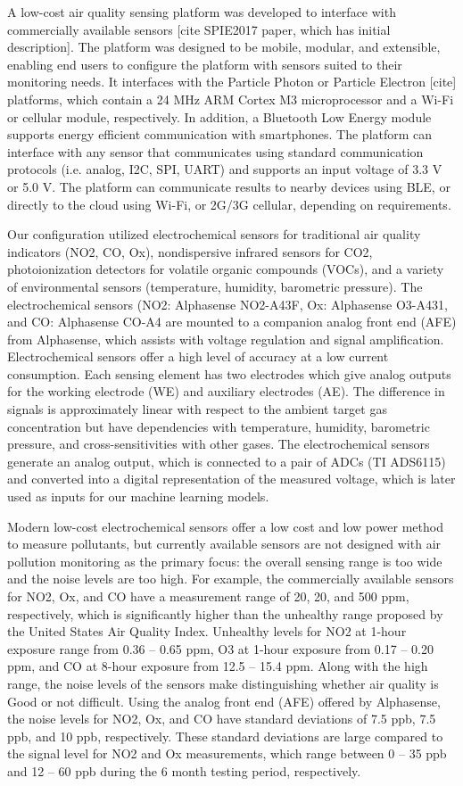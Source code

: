 \documentclass[journal abbreviation, manuscript]{copernicus}
\begin{document}
A low-cost air quality sensing platform was developed to interface with commercially available sensors [cite SPIE2017 paper, which has initial description]. The platform was designed to be mobile, modular, and extensible, enabling end users to configure the platform with sensors suited to their monitoring needs. It interfaces with the Particle Photon or Particle Electron [cite] platforms, which contain a 24 MHz ARM Cortex M3 microprocessor and a Wi-Fi or cellular module, respectively. In addition, a Bluetooth Low Energy module supports energy efficient communication with smartphones. The platform can interface with any sensor that communicates using standard communication protocols (i.e. analog, I2C, SPI, UART) and supports an input voltage of 3.3 V or 5.0 V. The platform can communicate results to nearby devices using BLE, or directly to the cloud using Wi-Fi, or 2G/3G cellular, depending on requirements.

Our configuration utilized electrochemical sensors for traditional air quality indicators (NO2, CO, Ox), nondispersive infrared sensors for CO2, photoionization detectors for volatile organic compounds (VOCs), and a variety of environmental sensors (temperature, humidity, barometric pressure). The electrochemical sensors (NO2: Alphasense NO2-A43F, Ox: Alphasense O3-A431, and CO: Alphasense CO-A4 are mounted to a companion analog front end (AFE) from Alphasense, which assists with voltage regulation and signal amplification. Electrochemical sensors offer a high level of accuracy at a low current consumption. Each sensing element has two electrodes which give analog outputs for the working electrode (WE) and auxiliary electrodes (AE). The difference in signals is approximately linear with respect to the ambient target gas concentration but have dependencies with temperature, humidity, barometric pressure, and cross-sensitivities with other gases. The electrochemical sensors generate an analog output, which is connected to a pair of ADCs (TI ADS6115) and converted into a digital representation of the measured voltage, which is later used as inputs for our machine learning models.

Modern low-cost electrochemical sensors offer a low cost and low power method to measure pollutants, but currently available sensors are not designed with air pollution monitoring as the primary focus: the overall sensing range is too wide and the noise levels are too high. For example, the commercially available sensors for NO2, Ox, and CO have a measurement range of 20, 20, and 500 ppm, respectively, which is significantly higher than the unhealthy range proposed by the United States Air Quality Index. Unhealthy levels for NO2 at 1-hour exposure range from 0.36 – 0.65 ppm, O3 at 1-hour exposure from 0.17 – 0.20 ppm, and CO at 8-hour exposure from 12.5 – 15.4 ppm. Along with the high range, the noise levels of the sensors make distinguishing whether air quality is Good or not difficult. Using the analog front end (AFE) offered by Alphasense, the noise levels for NO2, Ox, and CO have standard deviations of 7.5 ppb, 7.5 ppb, and 10 ppb, respectively. These standard deviations are large compared to the signal level for NO2 and Ox measurements, which range between 0 – 35 ppb and 12 – 60 ppb during the 6 month testing period, respectively.
\end{document}
